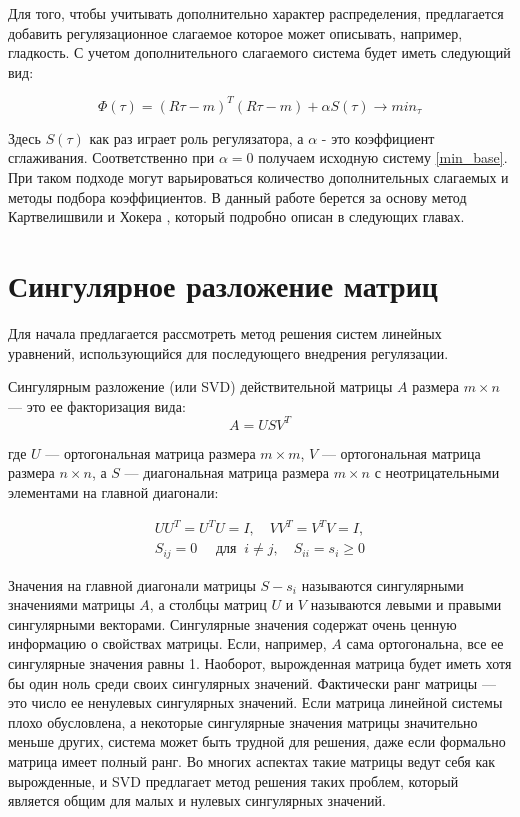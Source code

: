 \documentclass[a4paper,12pt]{diplom}
\renewcommand{\geq}{\geqslant}
\begin{document}
Для того, чтобы учитывать дополнительно характер распределения, предлагается добавить регулязационное слагаемое  
которое может описывать, например, гладкость. С учетом дополнительного слагаемого система будет иметь следующий вид: 

\begin{equation}
   \Phi(\tau)=(R\tau-m)^T (R\tau-m) + \alpha S(\tau) \to min_{\tau}
   \label{min_svd}
\end{equation}
  
Здесь $S(\tau)$ как раз играет роль регулязатора, а $\alpha$ - это коэффициент сглаживания. Соответственно при $\alpha = 0$ 
получаем исходную систему \eqref{min_base}. При таком подходе могут варьироваться количество дополнительных слагаемых и 
методы подбора коэффициентов. В данный работе берется за основу метод Картвелишвили и Хокера \cite{SvdHocker}, который подробно описан 
в следующих главах. 



\section{Сингулярное разложение матриц}

Для начала предлагается рассмотреть метод решения систем линейных уравнений, использующийся для последующего внедрения регулязации.

Сингулярным разложение (или SVD) действительной матрицы $A$ размера $m \times n$ — это ее факторизация вида: 
\begin{equation}
    A = U S V^T 
    \label{svd_decomp}
\end{equation}

где $U$ — ортогональная матрица размера $m \times m$, $V$ — ортогональная матрица размера $n \times n$, а $S$ — диагональная матрица размера 
$m \times n$ с неотрицательными элементами на главной диагонали: 

\begin{equation}
    \begin{array}{l}
        U U^T = U^T U = I, \quad VV ^T = V^T V = I, \\
        S_{ij} = 0 \quad \text{ для } \ i \neq j, \quad S_{ii} = s_{i} \geq 0
    \end{array}
\end{equation}

Значения на главной диагонали матрицы $S - s_{i}$  называются сингулярными значениями матрицы $A$, а столбцы матриц $U$ и $V$ называются левыми 
и правыми сингулярными векторами. Сингулярные значения содержат очень ценную информацию о свойствах матрицы. Если, например, 
$A$ сама ортогональна, все ее сингулярные значения равны 1. Наоборот, вырожденная матрица будет иметь хотя бы один ноль среди своих 
сингулярных значений. Фактически ранг матрицы — это число ее ненулевых сингулярных значений. Если матрица линейной системы плохо обусловлена, 
а некоторые сингулярные значения матрицы значительно меньше других, система может быть трудной для решения, даже если формально матрица 
имеет полный ранг. Во многих аспектах такие матрицы ведут себя как вырожденные, и SVD предлагает метод решения таких проблем, который 
является общим для малых и нулевых сингулярных значений.
\end{document}
